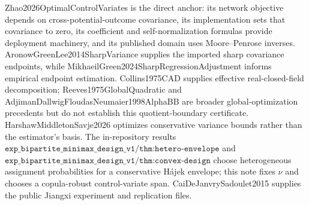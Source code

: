 Zhao2026OptimalControlVariates is the direct anchor: its network objective depends on cross-potential-outcome covariance, its implementation sets that covariance to zero, its coefficient and self-normalization formulas provide deployment machinery, and its published domain uses Moore--Penrose inverses.  AronowGreenLee2014SharpVariance supplies the imported sharp covariance endpoints, while MikhaeilGreen2024SharpRegressionAdjustment informs empirical endpoint estimation.  Collins1975CAD supplies effective real-closed-field decomposition; Reeves1975GlobalQuadratic and AdjimanDallwigFloudasNeumaier1998AlphaBB are broader global-optimization precedents but do not establish this quotient-boundary certificate.  HarshawMiddletonSavje2026 optimizes conservative variance bounds rather than the estimator's basis.  The in-repository results \(\texttt{exp\_bipartite\_minimax\_design\_v1/thm:hetero-envelope}\) and \(\texttt{exp\_bipartite\_minimax\_design\_v1/thm:convex-design}\) choose heterogeneous assignment probabilities for a conservative H\'ajek envelope; this note fixes \(\nu\) and chooses a copula-robust control-variate span.  CaiDeJanvrySadoulet2015 supplies the public Jiangxi experiment and replication files.